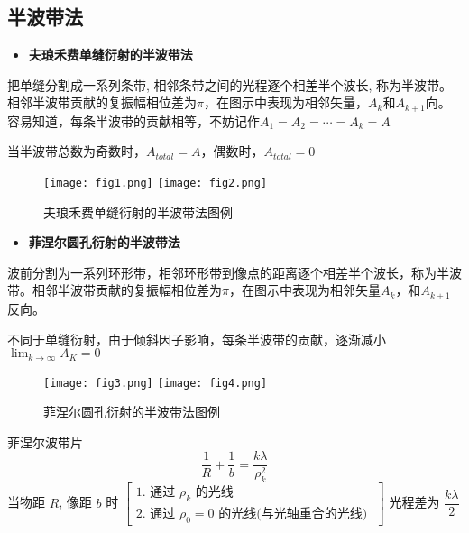 \subsection{半波带法}
\begin{itemize}
	\item \textbf{夫琅禾费单缝衍射的半波带法}
\end{itemize}
\quad \quad 把单缝分割成一系列条带, 相邻条带之间的光程逐个相差半个波长, 称为半波带。
	相邻半波带贡献的复振幅相位差为$\pi$，在图示中表现为相邻矢量，$A_k$和$A_{k+1}$向。
	容易知道，每条半波带的贡献相等，不妨记作$A_1=A_2=\cdots=A_k=A$
	\par 当半波带总数为奇数时，$A_{total}=A$，偶数时，$A_{total}=0$
\begin{figure}[!htp]
	\centering
	\texttt{[image: fig1.png]}
	\hspace{1cm}
	\texttt{[image: fig2.png]}
	\caption{夫琅禾费单缝衍射的半波带法图例}
\end{figure}

\begin{itemize} 
	\item \textbf{菲涅尔圆孔衍射的半波带法}
\end{itemize}

\par 波前分割为一系列环形带，相邻环形带到像点的距离逐个相差半个波长，称为半波带。相邻半波带贡献的复振幅相位差为$\pi$，在图示中表现为相邻矢量$A_k$，和$A_{k+1}$反向。
\par 不同于单缝衍射，由于倾斜因子影响，每条半波带的贡献，逐渐减小$\displaystyle \lim_{k\rightarrow \infty}A_{K}=0$
\begin{figure}[!htp]
	\centering
	\texttt{[image: fig3.png]}
	\hspace{1cm}
	\texttt{[image: fig4.png]}
	\caption{菲涅尔圆孔衍射的半波带法图例}
\end{figure}
\newline


\begin{myprop}{菲涅尔波带片}{}
	\[
	\frac{1}{R}+\frac{1}{b}=\frac{k \lambda}{\rho_k^2}
	\]
	当物距 $R$, 像距 $b$ 时 $\left[\begin{array}{c}1 \text {. 通过 } \rho_k \text { 的光线 } \\ 2 \text {. 通过 } \rho_0=0 \text { 的光线(与光轴重合的光线) }\end{array}\right]$ 光程差为 $\dfrac{k \lambda}{2}$
\end{myprop}

